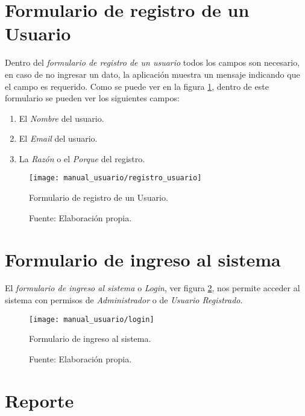\section{Formulario de registro de un Usuario}

Dentro del \emph{formulario de registro de un usuario} todos los campos son necesario, en caso de no ingresar un dato, la aplicación muestra un mensaje indicando que el campo es requerido. Como se puede ver en la figura \ref{fig:vista_registro_user}, dentro de este formulario se pueden ver los siguientes campos:
\begin{enumerate}
  \item El \emph{Nombre} del usuario.
  \item El \emph{Email} del usuario.
  \item La \emph{Razón} o el \emph{Porque} del registro.
\end{enumerate}

\begin{figure}[H]
      \begin{center}
        \texttt{[image: manual\_usuario/registro\_usuario]}

        \caption{Formulario de registro de un Usuario.}
        \label{fig:vista_registro_user}
        \caption*{Fuente: Elaboración propia.}
      \end{center}
\end{figure}


\section{Formulario de ingreso al sistema}

El \emph{formulario de ingreso al sistema} o \emph{Login}, ver figura \ref{fig:vista_login}, nos permite acceder al sistema con permisos de \emph{Administrador} o de \emph{Usuario Registrado}.

\begin{figure}[H]
      \begin{center}
        \texttt{[image: manual\_usuario/login]}

        \caption{Formulario de ingreso al sistema.}
        \label{fig:vista_login}
        \caption*{Fuente: Elaboración propia.}
      \end{center}
\end{figure}


\section{Reporte}

